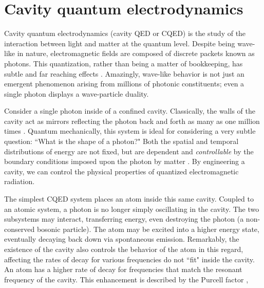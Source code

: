\documentclass[11 pt, oneside]{book} %
\begin{document}

\section{Cavity quantum electrodynamics}
Cavity quantum electrodynamics (cavity QED or CQED) is the study of the interaction between light and matter at the quantum level. Despite being wave-like in nature, electromagnetic fields are composed of discrete packets known as photons. This quantization, rather than being a matter of bookkeeping, has subtle and far reaching effects \cite{Schuster}. Amazingly, wave-like behavior is not just an emergent phenomenon arising from millions of photonic constituents; even a single photon displays a wave-particle duality. 

Consider a single photon inside of a confined cavity. Classically, the walls of the cavity act as mirrors reflecting the photon back and forth as many as one million times \cite{Vahala}. Quantum mechanically, this system is ideal for considering a very subtle question: ``What is the shape of a photon?" Both the spatial and temporal distributions of energy are not fixed, but are dependent and \emph{controllable} by the boundary conditions imposed upon the photon by matter \cite{Schuster}. By engineering a cavity, we can control the physical properties of quantized electromagnetic radiation. 

The simplest CQED system places an atom inside this same cavity. Coupled to an atomic system, a photon is no longer simply oscillating in the cavity. The two subsystems may interact, transferring energy, even destroying the photon (a non-conserved bosonic particle). The atom may be excited into a higher energy state, eventually decaying back down via spontaneous emission. Remarkably, the existence of the cavity also controls the behavior of the atom in this regard, affecting the rates of decay for various frequencies do not ``fit" inside the cavity. An atom has a higher rate of decay for frequencies that match the resonant frequency of the cavity. This enhancement is described by the Purcell factor \cite{Purcell},
\end{document}
